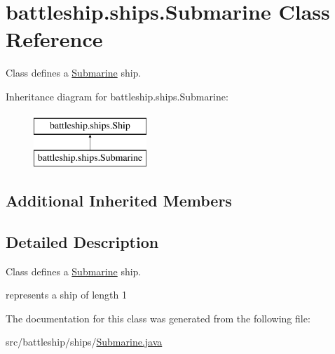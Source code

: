 \hypertarget{classbattleship_1_1ships_1_1Submarine}{}\section{battleship.\+ships.\+Submarine Class Reference}
\label{classbattleship_1_1ships_1_1Submarine}


Class defines a \hyperlink{classbattleship_1_1ships_1_1Submarine}{Submarine} ship.  


Inheritance diagram for battleship.\+ships.\+Submarine\+:\begin{figure}[H]
\begin{center}
\leavevmode
\includegraphics[height=2.000000cm]{classbattleship_1_1ships_1_1Submarine}
\end{center}
\end{figure}
\subsection*{Additional Inherited Members}


\subsection{Detailed Description}
Class defines a \hyperlink{classbattleship_1_1ships_1_1Submarine}{Submarine} ship. 

represents a ship of length 1 

The documentation for this class was generated from the following file\+:\begin{DoxyCompactItemize}
\item 
src/battleship/ships/\hyperlink{Submarine_8java}{Submarine.\+java}\end{DoxyCompactItemize}
